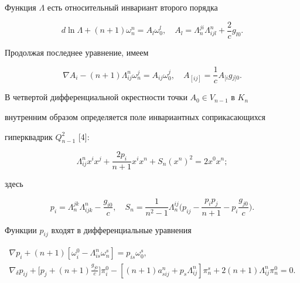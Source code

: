 Функция $\Lambda$ есть относительный инвариант второго порядка 


$$ 


d\ln\Lambda+(n+1)\omega^n_n=A_l\omega^l_0,\quad 


A_l=\Lambda^{ji}_n\Lambda^n_{ijl}+\frac{2}{c}g_{l0}. 


$$ 


Продолжая последнее уравнение, имеем 


$$ 


\nabla A_i-(n+1)\Lambda^n_{ij}\omega^j_n=A_{ij}\omega^j_0,\quad 


A_{[ij]}=\frac{1}{c}A{}_{[i}g{}_{j]0}. 


$$ 


 


В четвертой дифференциальной окрестности точки $A_0\in V_{n-1}$ в $K_n$ 


внутренним образом определяется поле инвариантных соприкасающихся 


гиперквадрик $Q^2_{n-1}$ [4]: 


\begin{equation} 


\Lambda^n_{ij}x^i x^j+\frac{2p_i}{n+1}x^i x^n+S_n(x^n)^2= 


2x^0 x^n; 


\end{equation} 


здесь 


\begin{equation} 


p_i=\Lambda^{jk}_n\Lambda^n_{ijk}-\frac{g_{i0}}{c},\quad 


S_n=\frac{1}{n^2-1}\Lambda^{ij}_n\bigg(p_{ij}- 


\frac{p_i p_j}{n+1}-p_i\frac{g_{j0}}{c}\bigg). 


\end{equation} 


Функции $p_{ij}$ входят в дифференциальные уравнения 


\begin{gather*} 


\nabla p_i+(n+1)[\omega^0_i-\Lambda^n_{is}\omega^s_n]= 


p_{is}\omega^s_0,\\ 


\nabla_\delta p_{ij}+\bigg[p_j+(n+1)\frac{g_{j0}}{c}\bigg] 


\pi^0_i-[(n+1)a^n_{sij}+p_s\Lambda^n_{ij}]\pi^s_n+ 


2(n+1)\Lambda^n_{ij}\pi^0_n=0. 


\end{gather*} 


